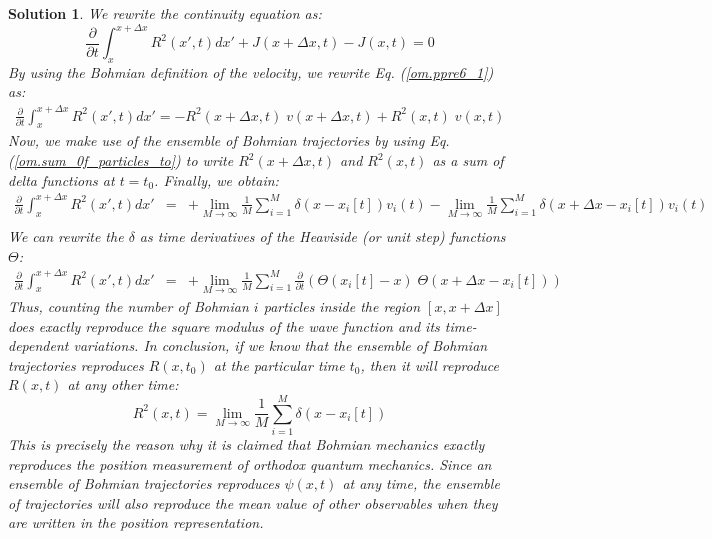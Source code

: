 \documentclass[onecolumn,nofootinbib, secnumarabic, amsmath, nobibnotes,11pt,aps,pra]{revtex4-1}
\newtheorem{solution}{Solution}
\newcommand{\eref}[1]{Eq. (\ref{#1})}
\begin{document}
\begin{solution}
We rewrite the continuity equation as:
\begin{equation}
\frac {\partial} {\partial t} \int_{x}^{x + \Delta x} R^2(x',t) dx' + J(x + \Delta x,t) - J(x,t) = 0
\label{om.ppre6_1}
\end{equation}
By using the Bohmian definition of the velocity, we rewrite \eref{om.ppre6_1} as:
\begin{eqnarray}
\frac {\partial} {\partial t} \int_{x}^{x + \Delta x} R^2(x',t) dx' = - { R^2(x + \Delta x,t) \; v(x + \Delta x,t) + R^2(x,t) \; v(x,t)}
\label{om.ppre6_2}
\end{eqnarray}
Now, we make use of the ensemble of Bohmian trajectories by using
\eref{om.sum_0f_particles_to} to write $R^2(x + \Delta x,t)$ and
$R^2(x,t)$ as a sum of delta functions at $t = t_0$. Finally, we
obtain:
\begin{eqnarray}
\frac {\partial} {\partial t} \int_{x}^{x + \Delta x} R^2(x',t) dx' &=&
+ \lim_{M\rightarrow\infty} \frac {1} {M} \sum_{i = 1}^{M} \delta(x - x_i[t]) v_i(t) -\lim_{M\rightarrow\infty} \frac {1} {M} \sum_{i = 1}^{M} \delta(x + \Delta x - x_i[t]) v_i(t)\nonumber\\
\label{om.ppre6_3}
\end{eqnarray}
We can rewrite the $\delta$ as time derivatives of the Heaviside (or
unit step) functions $\Theta$:
\begin{eqnarray}
\frac {\partial} {\partial t} \int_{x}^{x + \Delta x} R^2(x',t) dx' &=&
+ \lim_{M\rightarrow\infty} \frac {1} {M} \sum_{i = 1}^{M} \frac {\partial} {\partial t} \left( \Theta(x_i[t] - x) \; \Theta (x + \Delta x - x_i[t]) \right)\quad\qquad
\label{om.ppre6_4}
\end{eqnarray}
Thus, counting the number of Bohmian $i$ particles inside the region
$[x,x + \Delta x]$ does exactly reproduce the square modulus of the
wave function and its time-dependent variations. In conclusion, if
we know that the ensemble of Bohmian trajectories reproduces
$R(x,t_0)$ at the particular time $t_0$, then it will reproduce
$R(x,t)$ at any other time:
\begin{equation}
R^2(x,t) = \lim_{M\rightarrow\infty} \frac {1} {M}  \sum_{i = 1}^{M} \delta(x - x_i[t])
\end{equation}
This is precisely the reason why it is claimed that Bohmian mechanics exactly reproduces the position measurement of orthodox quantum mechanics. Since an ensemble of Bohmian trajectories reproduces $\psi(x,t)$ at any time, the ensemble of trajectories will also reproduce the mean value of other observables when they are written in the position representation.\\
\end{solution}
\end{document}
